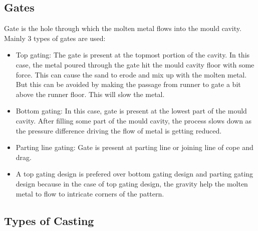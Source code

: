 \documentclass{article}
\begin{document}
	\subsection{Gates}
		Gate is the hole through which the molten metal flows into the mould cavity. Mainly 3 types of gates are used:
	\begin{itemize}
		\item Top gating: The gate is present at the topmost portion of the cavity. In this case, the metal poured through the gate hit the mould cavity floor with some force. This can cause the sand to erode and mix up with the molten metal. But this can be avoided by making the passage from runner to gate a bit above the runner floor. This will slow the metal.

		\item Bottom gating: In this case, gate is present at the lowest part of the mould cavity. After filling some part of the mould cavity, the process slows down as the pressure difference driving the flow of metal is getting reduced.

		\item Parting line gating: Gate is present at parting line or joining line of cope and drag.

		\item A top gating design is prefered over bottom gating design and parting gating design because in the case of top gating design, the gravity help the molten metal to flow to intricate corners of the pattern.
	\end{itemize}


\subsection{Types of Casting}
\end{document}
